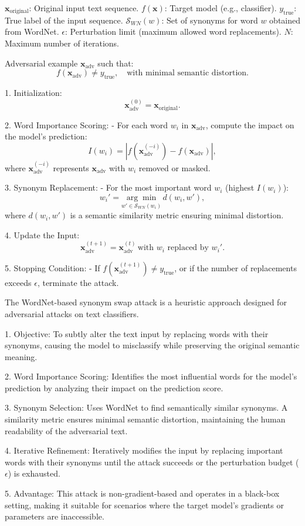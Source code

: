 $\mathbf{x}_{\text{original}}$: Original input text sequence.  
$f(\mathbf{x})$: Target model (e.g., classifier).  
$y_{\text{true}}$: True label of the input sequence.  
$\mathcal{S}_{WN}(w)$: Set of synonyms for word $w$ obtained from WordNet.  
$\epsilon$: Perturbation limit (maximum allowed word replacements).  
$N$: Maximum number of iterations.

Adversarial example $\mathbf{x}_{\text{adv}}$ such that:  
\[
f(\mathbf{x}_{\text{adv}}) \neq y_{\text{true}}, \quad \text{with minimal semantic distortion}.
\]

1. Initialization:  
   \[
   \mathbf{x}_{\text{adv}}^{(0)} = \mathbf{x}_{\text{original}}.
   \]

2. Word Importance Scoring:  
   - For each word $w_i$ in $\mathbf{x}_{\text{adv}}$, compute the impact on the model's prediction:  
     \[
     I(w_i) = |f(\mathbf{x}_{\text{adv}}^{(-i)}) - f(\mathbf{x}_{\text{adv}})|,
     \]  
     where $\mathbf{x}_{\text{adv}}^{(-i)}$ represents $\mathbf{x}_{\text{adv}}$ with $w_i$ removed or masked.

3. Synonym Replacement:  
   - For the most important word $w_i$ (highest $I(w_i)$):  
     \[
     w_i' = \underset{w' \in \mathcal{S}_{WN}(w_i)}{\arg \min} \, d(w_i, w'),
     \]  
     where $d(w_i, w')$ is a semantic similarity metric ensuring minimal distortion.

4. Update the Input:  
   \[
   \mathbf{x}_{\text{adv}}^{(t+1)} = \mathbf{x}_{\text{adv}}^{(t)} \, \text{with } w_i \text{ replaced by } w_i'.
   \]

5. Stopping Condition:  
   - If $f(\mathbf{x}_{\text{adv}}^{(t+1)}) \neq y_{\text{true}}$, or if the number of replacements exceeds $\epsilon$, terminate the attack.

The WordNet-based synonym swap attack is a heuristic approach designed for adversarial attacks on text classifiers.

1. Objective: To subtly alter the text input by replacing words with their synonyms, causing the model to misclassify while preserving the original semantic meaning.  

2. Word Importance Scoring: Identifies the most influential words for the model's prediction by analyzing their impact on the prediction score.  

3. Synonym Selection: Uses WordNet to find semantically similar synonyms. A similarity metric ensures minimal semantic distortion, maintaining the human readability of the adversarial text.  

4. Iterative Refinement: Iteratively modifies the input by replacing important words with their synonyms until the attack succeeds or the perturbation budget ($\epsilon$) is exhausted.  

5. Advantage: This attack is non-gradient-based and operates in a black-box setting, making it suitable for scenarios where the target model's gradients or parameters are inaccessible.
